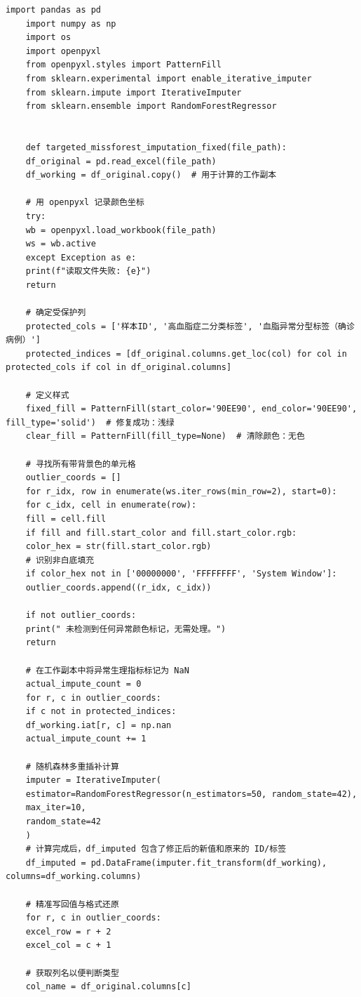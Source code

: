\documentclass[12pt]{article}
\begin{document}
\begin{lstlisting}[caption={随机森林多重插补异常值处理}, label={code:missforest_impute}]
	import pandas as pd
	import numpy as np
	import os
	import openpyxl
	from openpyxl.styles import PatternFill
	from sklearn.experimental import enable_iterative_imputer
	from sklearn.impute import IterativeImputer
	from sklearn.ensemble import RandomForestRegressor
	
	
	def targeted_missforest_imputation_fixed(file_path):
	df_original = pd.read_excel(file_path)
	df_working = df_original.copy()  # 用于计算的工作副本
	
	# 用 openpyxl 记录颜色坐标
	try:
	wb = openpyxl.load_workbook(file_path)
	ws = wb.active
	except Exception as e:
	print(f"读取文件失败: {e}")
	return
	
	# 确定受保护列
	protected_cols = ['样本ID', '高血脂症二分类标签', '血脂异常分型标签（确诊病例）']
	protected_indices = [df_original.columns.get_loc(col) for col in protected_cols if col in df_original.columns]
	
	# 定义样式
	fixed_fill = PatternFill(start_color='90EE90', end_color='90EE90', fill_type='solid')  # 修复成功：浅绿
	clear_fill = PatternFill(fill_type=None)  # 清除颜色：无色
	
	# 寻找所有带背景色的单元格
	outlier_coords = []
	for r_idx, row in enumerate(ws.iter_rows(min_row=2), start=0):
	for c_idx, cell in enumerate(row):
	fill = cell.fill
	if fill and fill.start_color and fill.start_color.rgb:
	color_hex = str(fill.start_color.rgb)
	# 识别非白底填充
	if color_hex not in ['00000000', 'FFFFFFFF', 'System Window']:
	outlier_coords.append((r_idx, c_idx))
	
	if not outlier_coords:
	print(" 未检测到任何异常颜色标记，无需处理。")
	return
	
	# 在工作副本中将异常生理指标标记为 NaN
	actual_impute_count = 0
	for r, c in outlier_coords:
	if c not in protected_indices:
	df_working.iat[r, c] = np.nan
	actual_impute_count += 1
	
	# 随机森林多重插补计算
	imputer = IterativeImputer(
	estimator=RandomForestRegressor(n_estimators=50, random_state=42),
	max_iter=10,
	random_state=42
	)
	# 计算完成后，df_imputed 包含了修正后的新值和原来的 ID/标签
	df_imputed = pd.DataFrame(imputer.fit_transform(df_working), columns=df_working.columns)
	
	# 精准写回值与格式还原
	for r, c in outlier_coords:
	excel_row = r + 2
	excel_col = c + 1
	
	# 获取列名以便判断类型
	col_name = df_original.columns[c]
	

\end{lstlisting}
\end{document}
